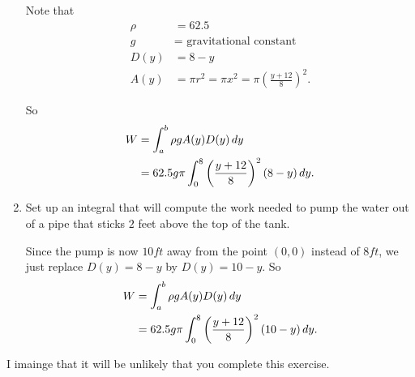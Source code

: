 \documentclass[noinstructornotes]{ximera}
\begin{document}
\begin{problem}
\begin{enumerate}
\begin{freeResponse}
		Note that
			\begin{align*}
			\rho &= 62.5  \\
			g &= \text{ gravitational constant}  \\
			D(y) &= 8-y  \\
			A(y) &= \pi r^2 = \pi x^2 = \pi \left( \frac{y+12}{8} \right)^2.
			\end{align*}
		
		So
			\begin{align*}
			W &= \int_a^b \rho g A(y) D(y) \,d y  \\
			&= 62.5 g \pi \int_0^8 \left( \frac{y+12}{8} \right)^2 (8-y) \,d y.
			\end{align*}
		\end{freeResponse}
		
		
		
		\item  Set up an integral that will compute the work needed to pump the water out of a pipe that sticks $2$ feet above the top of the tank.
		\begin{freeResponse}
		Since the pump is now $10 ft$ away from the point $(0,0)$ instead of $8 ft$, we just replace $D(y) = 8-y$ by $D(y) = 10-y$.  
		So
			\begin{align*}
			W &= \int_a^b \rho g A(y) D(y) \,d y  \\
			&= 62.5 g \pi \int_0^8 \left( \frac{y+12}{8} \right)^2 (10-y) \,d y.
			\end{align*}
		\end{freeResponse}
		
	\end{enumerate}

\end{problem}

\begin{instructorNotes}
I imainge that it will be unlikely that you complete this exercise.
\end{instructorNotes}
\end{document}
